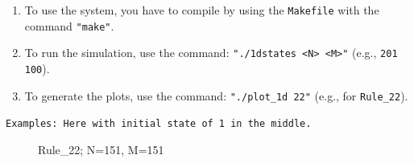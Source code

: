 \documentclass[12pt,a4paper]{article}
\begin{document}
\begin{enumerate}[label=\roman*.]
    \item 
    To use the system, you have to compile by using the \texttt{Makefile} with the command \texttt{"make"}.
    \newline
    \vspace{0.1 cm}

    \item 
    To run the simulation, use the command: \texttt{"./1dstates <N> <M>"} (e.g., \texttt{201 100}).
    \newline
    \vspace{0.1 cm}

    \item 
    To generate the plots, use the command: \texttt{"./plot\_1d 22"} (e.g., for \texttt{Rule\_22}).
\end{enumerate} 

\vspace{3.5 cm}
\texttt{Examples: Here with initial state of 1 in the middle.}  
\newline


\begin{figure}[H]
    \centering
    \caption{\small Rule\_22; N=151, M=151}
    \label{fig:your_label}
\end{figure}

\vspace{0.5cm}
\end{document}
